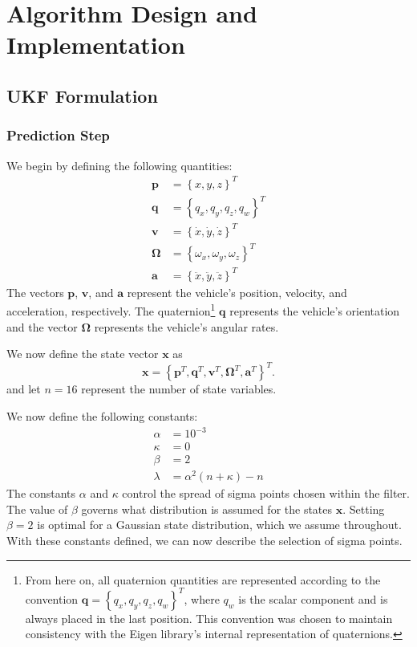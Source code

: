 \chapter{Algorithm Design and Implementation} \label{ch:alg_design}

\section{UKF Formulation} \label{sec:ukf_formulation}

\subsection{Prediction Step}

We begin by defining the following quantities:
%
\begin{align} \label{eq:state_vars}
\mathbf{p} &= \left\lbrace x, y, z \right\rbrace ^{T} \\
\mathbf{q} &= \left\lbrace q_{x}, q_{y}, q_{z}, q_{w} \right\rbrace ^{T} \\
\mathbf{v} &= \left\lbrace \dot{x}, \dot{y}, \dot{z} \right\rbrace ^{T} \\
\mathbf{\Omega} &= \left\lbrace \omega_{x}, \omega_{y}, \omega_{z} \right\rbrace ^{T} \\
\mathbf{a} &= \left\lbrace \ddot{x}, \ddot{y}, \ddot{z} \right\rbrace ^{T}
\end{align}
%
The vectors $\mathbf{p}$, $\mathbf{v}$, and $\mathbf{a}$ represent the vehicle's position, velocity, and acceleration, respectively. The quaternion\footnote{From here on, all quaternion quantities are represented according to the convention $\mathbf{q} = \left\lbrace q_{x}, q_{y}, q_{z}, q_{w} \right\rbrace ^{T}$, where $q_{w}$ is the scalar component and is always placed in the last position. This convention was chosen to maintain consistency with the Eigen library's internal representation of quaternions.} $\mathbf{q}$ represents the vehicle's orientation and the vector $\mathbf{\Omega}$ represents the vehicle's angular rates. 

We now define the state vector $\mathbf{x}$ as
%
\begin{equation}
\mathbf{x} = 
\left\lbrace
    \mathbf{p}^{T},
    \mathbf{q}^{T},
    \mathbf{v}^{T},
    \mathbf{\Omega}^{T},
    \mathbf{a}^{T}
\right\rbrace ^{T}.
\end{equation}
%
and let $n = 16$ represent the number of state variables.

We now define the following constants:
%
\begin{align}
\alpha &= 10^{-3} \nonumber \\
\kappa &= 0 \\
\beta &= 2 \nonumber \\
\lambda &= \alpha^{2} \left( n + \kappa \right) - n \nonumber
\end{align}
%
The constants $\alpha$ and $\kappa$ control the spread of sigma points chosen within the filter. The value of $\beta$ governs what distribution is assumed for the states $\mathbf{x}$. Setting $\beta = 2$ is optimal for a Gaussian state distribution, which we assume throughout. With these constants defined, we can now describe the selection of sigma points.

